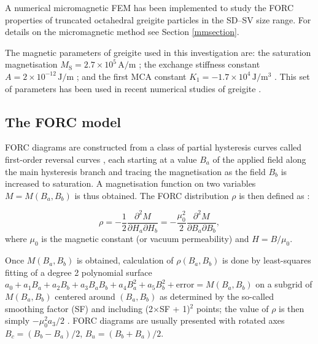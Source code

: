 
A numerical micromagnetic FEM \citep{OConbhui2017} has been implemented to study the FORC properties of truncated octahedral greigite particles in the SD--SV size range. For details on the micromagnetic method see Section \ref{mmsection}.\par

The magnetic parameters of greigite used in this investigation are: the saturation magnetisation $M_\text{S}= 2.7 \times 10^5\,\text{A/m}$ \citep{Li2014}; the exchange stiffness constant $A=2\times10^{-12}\,\text{J}/\text{m}$ \citep{Chang2008}; and the first MCA constant $K_1=-1.7\times10^4\,\text{J}/\text{m}^3$ \citep{Winklhofer2014}. This set of parameters has been used in recent numerical studies of greigite \citep{ValdezGrijalva2017B,ValdezGrijalva2017}.\par

\subsection{The FORC model}
FORC diagrams are constructed from a class of partial hysteresis curves called first-order reversal curves \citep{Mayergoyz1986}, each starting at a value $B_a$ of the applied field along the main hysteresis branch and tracing the magnetisation as the field $B_b$ is increased to saturation. A magnetisation function on two variables $M=M(B_a, B_b)$ is thus obtained. The FORC distribution $\rho$ is then defined as \citep{Roberts2000}:
{\par\nobreak\noindent}
\begin{equation}
\rho=-\frac{1}{2}\frac{\partial^2 M}{\partial H_a \partial H_b}=-\frac{\mu_0^2}{2}\frac{\partial^2 M}{\partial B_a \partial B_b},
\end{equation}
where $\mu_0$ is the magnetic constant (or vacuum permeability) and $H=B/\mu_0$.\par

Once $M(B_a, B_b)$ is obtained, calculation of $\rho(B_a, B_b)$ is done by least-squares fitting of a degree 2 polynomial surface $a_0 + a_1 B_a + a_2 B_b + a_3 B_a B_b + a_4 B_a^2 + a_5 B_b^2 + \text{error} = M(B_a,B_b)$ on a subgrid of $M(B_a, B_b)$ centered around $(B_a, B_b)$ as determined by the so-called smoothing factor (SF) and including (2$\times$SF + 1)$^2$ points; the value of $\rho$ is then simply $-\mu_0^2 a_3/2$ \citep{Pike1999}. FORC diagrams are usually presented with rotated axes $B_c=(B_b - B_a)/2$, $B_u=(B_b + B_a)/2$.\par

